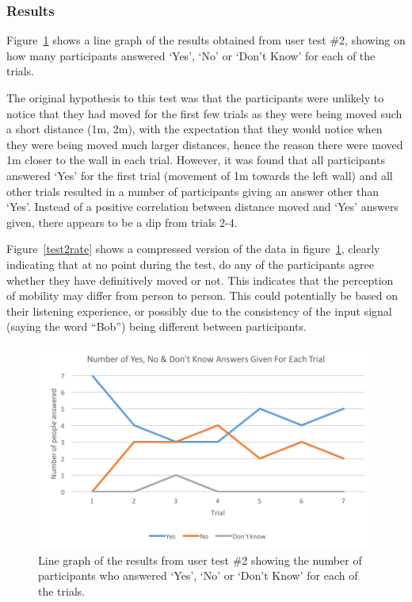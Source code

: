\documentclass[../../main.tex]{subfiles}
\begin{document}
			\subsubsection{Results}

				Figure~\ref{test2results} shows a line graph of the results obtained from user test \#2, showing on how many participants answered `Yes', `No' or `Don't Know' for each of the trials.

				The original hypothesis to this test was that the participants were unlikely to notice that they had moved for the first few trials as they were being moved such a short distance (1m, 2m), with the expectation that they would notice when they were being moved much larger distances, hence the reason there were moved 1m closer to the wall in each trial. However, it was found that all participants answered `Yes' for the first trial (movement of 1m towards the left wall) and all other trials resulted in a number of participants giving an answer other than `Yes'. Instead of a positive correlation between distance moved and `Yes' answers given, there appears to be a dip from trials 2-4.

				Figure~\ref{test2rate} shows a compressed version of the data in figure~\ref{test2results}, clearly indicating that at no point during the test, do any of the participants agree whether they have definitively moved or not. This indicates that the perception of mobility may differ from person to person. This could potentially be based on their listening experience, or possibly due to the consistency of the input signal (saying the word ``Bob'') being different between participants.

				\begin{figure}[H]
					\centerline{\includegraphics[scale = 1]{Sections/userTesting/images/test2/Q2_edit.png}}
					\caption{Line graph of the results from user test \#2 showing the number of participants who answered `Yes', `No' or `Don't Know' for each of the trials.}
					\label{test2results}
				\end{figure}
\end{document}
